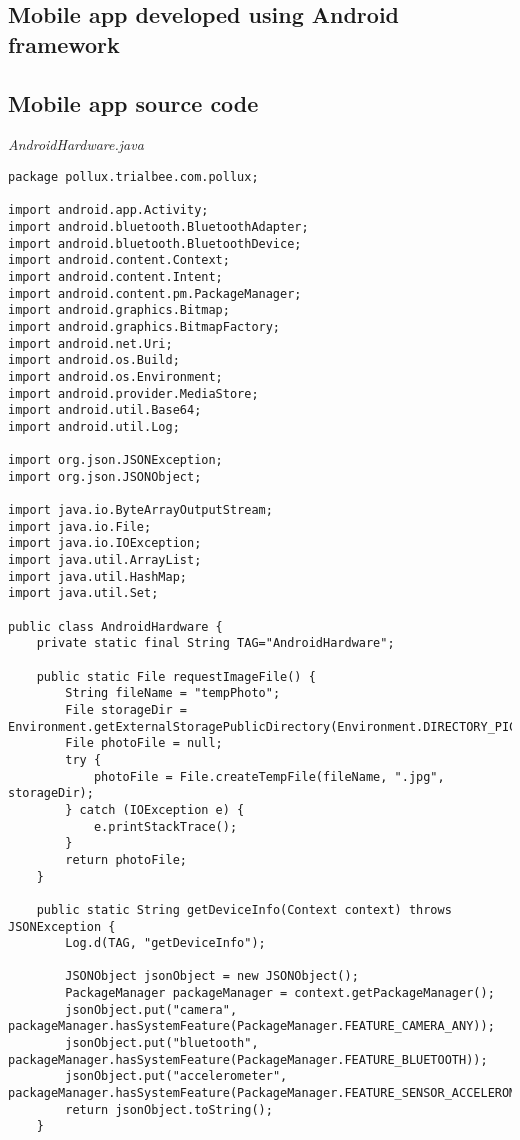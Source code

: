 \begin{appendices}
\chapter{Mobile app developed using Android framework} 
\section{Mobile app source code} \label{app:mobile-app-source-code-android}
\emph{AndroidHardware.java}
\begin{lstlisting}
package pollux.trialbee.com.pollux;

import android.app.Activity;
import android.bluetooth.BluetoothAdapter;
import android.bluetooth.BluetoothDevice;
import android.content.Context;
import android.content.Intent;
import android.content.pm.PackageManager;
import android.graphics.Bitmap;
import android.graphics.BitmapFactory;
import android.net.Uri;
import android.os.Build;
import android.os.Environment;
import android.provider.MediaStore;
import android.util.Base64;
import android.util.Log;

import org.json.JSONException;
import org.json.JSONObject;

import java.io.ByteArrayOutputStream;
import java.io.File;
import java.io.IOException;
import java.util.ArrayList;
import java.util.HashMap;
import java.util.Set;

public class AndroidHardware {
    private static final String TAG="AndroidHardware";

    public static File requestImageFile() {
        String fileName = "tempPhoto";
        File storageDir = Environment.getExternalStoragePublicDirectory(Environment.DIRECTORY_PICTURES);
        File photoFile = null;
        try {
            photoFile = File.createTempFile(fileName, ".jpg", storageDir);
        } catch (IOException e) {
            e.printStackTrace();
        }
        return photoFile;
    }

    public static String getDeviceInfo(Context context) throws JSONException {
        Log.d(TAG, "getDeviceInfo");

        JSONObject jsonObject = new JSONObject();
        PackageManager packageManager = context.getPackageManager();
        jsonObject.put("camera", packageManager.hasSystemFeature(PackageManager.FEATURE_CAMERA_ANY));
        jsonObject.put("bluetooth", packageManager.hasSystemFeature(PackageManager.FEATURE_BLUETOOTH));
        jsonObject.put("accelerometer", packageManager.hasSystemFeature(PackageManager.FEATURE_SENSOR_ACCELEROMETER));
        return jsonObject.toString();
    }


\end{lstlisting}
\end{appendices}
